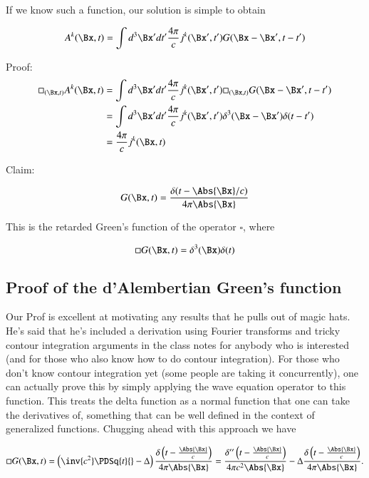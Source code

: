 If we know such a function, our solution is simple to obtain

\begin{equation}\label{eqn:relativisticElectrodynamicsL18:50}
A^k(\Bx, t)
= \int d^3 \Bx' dt' \frac{4 \pi}{c} j^k(\Bx', t') G(\Bx - \Bx', t - t')
\end{equation}

Proof:
\begin{align*}
\square_{(\Bx, t)} A^k(\Bx, t)
&=
\int d^3 \Bx' dt' \frac{4 \pi}{c} j^k(\Bx', t')
\square_{(\Bx, t)}
G(\Bx - \Bx', t - t') \\
&=
\int d^3 \Bx' dt' \frac{4 \pi}{c} j^k(\Bx', t')
\delta^3( \Bx - \Bx') \delta( t - t') \\
&=
\frac{4 \pi}{c} j^k(\Bx, t)
\end{align*}

Claim:

\begin{equation}\label{eqn:relativisticElectrodynamicsL18:70}
G(\Bx, t) = \frac{\delta(t - \Abs{\Bx}/c)}{4 \pi \Abs{\Bx} }
\end{equation}

This is the retarded Green's function of the operator $\square$, where

\begin{equation}\label{eqn:relativisticElectrodynamicsL18:90}
\square G(\Bx, t) = \delta^3(\Bx) \delta(t)
\end{equation}

\subsection{Proof of the d'Alembertian Green's function}

Our Prof is excellent at motivating any results that he pulls out of magic hats.  He's said that he's included a derivation using Fourier transforms and tricky contour integration arguments in the class notes for anybody who is interested (and for those who also know how to do contour integration).  For those who don't know contour integration yet (some people are taking it concurrently), one can actually prove this by simply applying the wave equation operator to this function.  This treats the delta function as a normal function that one can take the derivatives of, something that can be well defined in the context of generalized functions.  Chugging ahead with this approach we have

\begin{equation}\label{eqn:relativisticElectrodynamicsL18:110}
\square G(\Bx, t)
=
\left(\inv{c^2} \PDSq{t}{} - \Delta\right)
\frac{\delta\left(t - \frac{\Abs{\Bx}}{c}\right)}{4 \pi \Abs{\Bx} }
=
\frac{\delta''\left(t - \frac{\Abs{\Bx}}{c}\right)}{4 \pi c^2 \Abs{\Bx} }
- \Delta \frac{\delta\left(t - \frac{\Abs{\Bx}}{c}\right)}{4 \pi \Abs{\Bx} }.
\end{equation}

